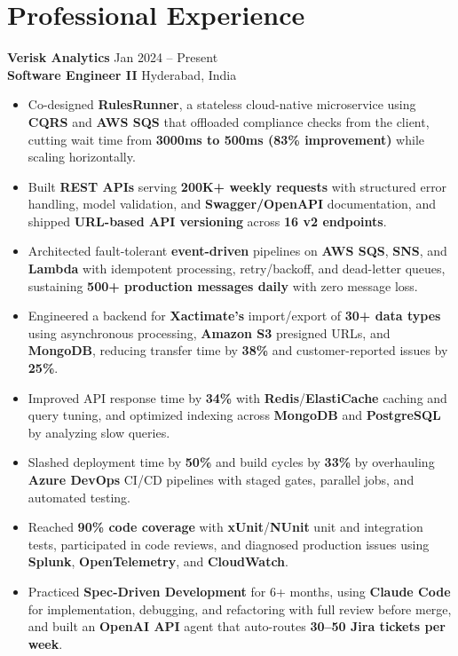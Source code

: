 \documentclass[a4paper,10pt]{article}
\begin{document}
\section*{Professional Experience}

\textbf{Verisk Analytics} \hfill Jan 2024 -- Present \\
\textbf{Software Engineer II} \hfill Hyderabad, India

\begin{itemize}[leftmargin=*]
    \item Co-designed \textbf{RulesRunner}, a stateless cloud-native microservice using \textbf{CQRS} and \textbf{AWS SQS} that offloaded compliance checks from the client, cutting wait time from \textbf{3000ms to 500ms (83\% improvement)} while scaling horizontally.
    \item Built \textbf{REST APIs} serving \textbf{200K+ weekly requests} with structured error handling, model validation, and \textbf{Swagger/OpenAPI} documentation, and shipped \textbf{URL-based API versioning} across \textbf{16 v2 endpoints}.
    \item Architected fault-tolerant \textbf{event-driven} pipelines on \textbf{AWS SQS}, \textbf{SNS}, and \textbf{Lambda} with idempotent processing, retry/backoff, and dead-letter queues, sustaining \textbf{500+ production messages daily} with zero message loss.
    \item Engineered a backend for \textbf{Xactimate's} import/export of \textbf{30+ data types} using asynchronous processing, \textbf{Amazon S3} presigned URLs, and \textbf{MongoDB}, reducing transfer time by \textbf{38\%} and customer-reported issues by \textbf{25\%}.
    \item Improved API response time by \textbf{34\%} with \textbf{Redis}/\textbf{ElastiCache} caching and query tuning, and optimized indexing across \textbf{MongoDB} and \textbf{PostgreSQL} by analyzing slow queries.
    \item Slashed deployment time by \textbf{50\%} and build cycles by \textbf{33\%} by overhauling \textbf{Azure DevOps} CI/CD pipelines with staged gates, parallel jobs, and automated testing.
    \item Reached \textbf{90\% code coverage} with \textbf{xUnit}/\textbf{NUnit} unit and integration tests, participated in code reviews, and diagnosed production issues using \textbf{Splunk}, \textbf{OpenTelemetry}, and \textbf{CloudWatch}.
    \item Practiced \textbf{Spec-Driven Development} for 6+ months, using \textbf{Claude Code} for implementation, debugging, and refactoring with full review before merge, and built an \textbf{OpenAI API} agent that auto-routes \textbf{30--50 Jira tickets per week}.
\end{itemize}
\end{document}
